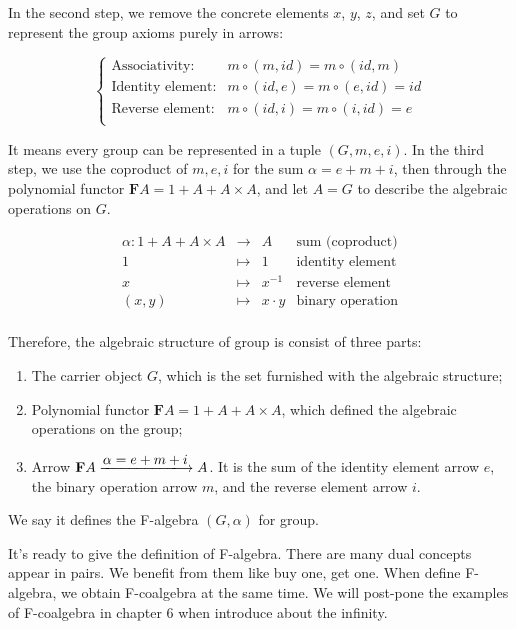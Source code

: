 \documentclass[b5paper]{article}
\begin{document}
\begin{example}
In the second step, we remove the concrete elements $x$, $y$, $z$, and set $G$ to represent the group axioms purely in arrows:

\[
\begin{cases}
\text{Associativity:} & m \circ (m, id) = m \circ (id, m) \\
\text{Identity element:} & m \circ (id, e) = m \circ (e, id) = id \\
\text{Reverse element:} & m \circ (id, i) = m \circ (i, id) = e \\
\end{cases}
\]

It means every group can be represented in a tuple $(G, m, e, i)$. In the third step, we use the coproduct of $m, e, i$ for the sum $\alpha = e + m + i$, then through the polynomial functor $\mathbf{F} A = 1 + A + A \times A$, and let $A = G$ to describe the algebraic operations on $G$.

\[
\begin{array}{rcll}
\alpha : 1 + A + A \times A & \longrightarrow & A & \text{sum (coproduct)}\\
1 & \longmapsto & 1 & \text{identity element}  \\
x & \longmapsto & x^{-1} & \text{reverse element} \\
(x, y) & \longmapsto & x \cdot y & \text{binary operation} \\
\end{array}
\]

Therefore, the algebraic structure of group is consist of three parts:

\begin{enumerate}
  \item The carrier object $G$, which is the set furnished with the algebraic structure;
  \item Polynomial functor $\mathbf{F} A = 1 + A + A \times A$, which defined the algebraic operations on the group;
  \item Arrow $\mathbf{F} A \arrowto{\alpha = e + m + i} A$. It is the sum of the identity element arrow $e$, the binary operation arrow $m$, and the reverse element arrow $i$.
\end{enumerate}

We say it defines the F-algebra $(G, \alpha)$ for group.
\end{example}

 
It's ready to give the definition of F-algebra. There are many dual concepts appear in pairs. We benefit from them like buy one, get one. When define F-algebra, we obtain F-coalgebra at the same time. We will post-pone the examples of F-coalgebra in chapter 6 when introduce about the infinity.
\end{document}
